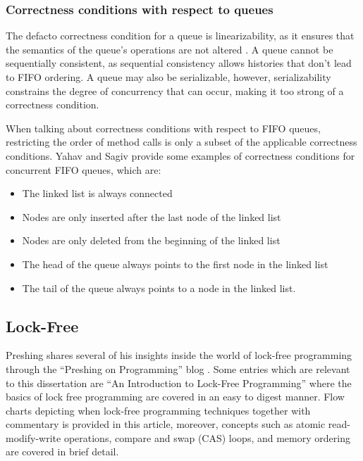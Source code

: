 \subsubsection{Correctness conditions with respect to queues}
The defacto correctness condition for a queue is linearizability, as it ensures that the semantics of the queue's operations are not altered \cite{mellor1987concurrent}. A queue cannot be sequentially consistent, as sequential consistency allows histories that don't lead to FIFO ordering. A queue may also be serializable, however, serializability constrains the degree of concurrency that can occur, making it too strong of a correctness condition.

When talking about correctness conditions with respect to FIFO queues, restricting the order of method calls is only a subset of the applicable correctness conditions. Yahav and Sagiv\cite{yahav2003automatically} provide some examples of correctness conditions for concurrent FIFO queues, which are:
\begin{itemize}
  \item The linked list is always connected
  \item Nodes are only inserted after the last node of the linked list
  \item Nodes are only deleted from the beginning of the linked list
  \item The head of the queue always points to the first node in the linked list
  \item The tail of the queue always points to a node in the linked list.
\end{itemize}

\subsection{Lock-Free}
\label{lock-free-queues}
Preshing shares several of his insights inside the world of lock-free programming through the ``Preshing on Programming'' blog \cite{preshing}. Some entries which are relevant to this dissertation are ``An Introduction to Lock-Free Programming''\cite{introlockfree} where the basics of lock free programming are covered in an easy to digest manner. Flow charts depicting when lock-free programming techniques together with commentary is provided in this article, moreover, concepts such as atomic read-modify-write operations, compare and swap (CAS) loops, and memory ordering are covered in brief detail. 


